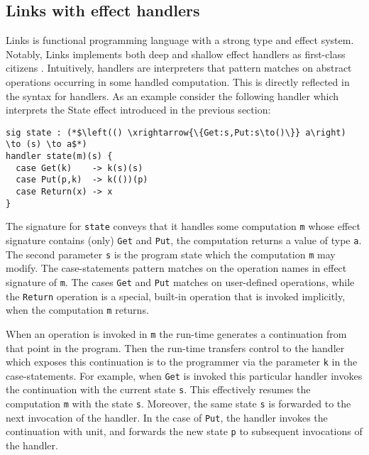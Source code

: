 \documentclass[preprint,10pt,numbers]{sigplanconf}
\begin{document}


  \subsection{Links with effect handlers}\label{sec:effect-links}
Links is functional programming language \cite{Cooper2006} with a strong type and effect system. Notably, Links implements both deep and shallow effect handlers as first-class citizens \cite{Hillerstrom2015}. Intuitively, handlers are interpreters that pattern matches on abstract operations occurring in some handled computation. This is directly reflected in the syntax for handlers. As an example consider the following handler which interprets the State effect introduced in the previous section:
\begin{lstlisting}[style=links,caption={}]
sig state : (*$\left(() \xrightarrow{\{Get:s,Put:s\to()\}} a\right) \to (s) \to a$*)
handler state(m)(s) {
  case Get(k)    -> k(s)(s)
  case Put(p,k)  -> k(())(p)
  case Return(x) -> x
}
\end{lstlisting}
The signature for \texttt{state} conveys that it handles some computation \texttt{m} whose effect signature contains (only) \texttt{Get} and \texttt{Put}, the computation returns a value of type \texttt{a}. The second parameter \texttt{s} is the program state which the computation \texttt{m} may modify.
The case-statements pattern matches on the operation names in effect signature of \texttt{m}.
The cases \texttt{Get} and \texttt{Put} matches on user-defined operations, while the \texttt{Return} operation is a special, built-in operation that is invoked implicitly, when the computation \texttt{m} returns.

When an operation is invoked in \texttt{m} the run-time generates a continuation from that point in the program. Then the run-time transfers control to the handler which exposes this continuation is to the programmer via the parameter \texttt{k} in the case-statements. For example, when \texttt{Get} is invoked this particular handler invokes the continuation with the current state \texttt{s}. This effectively resumes the computation \texttt{m} with the state \texttt{s}. Moreover, the same state \texttt{s} is forwarded to the next invocation of the handler. In the case of \texttt{Put}, the handler invokes the continuation with unit, and forwards the new state \texttt{p} to subsequent invocations of the handler.
\end{document}
